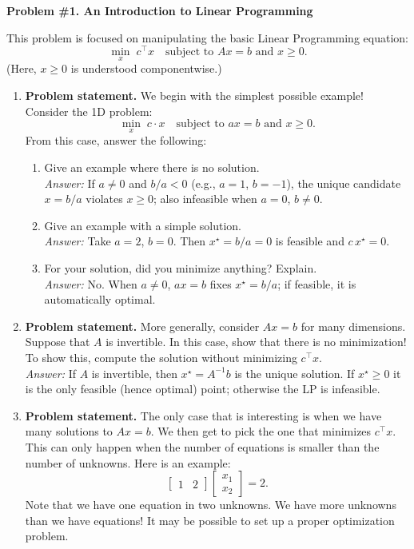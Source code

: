 \documentclass[11pt]{article}
\begin{document}
	
\textbf{Problem \#1. An Introduction to Linear Programming}
	
This problem is focused on manipulating the basic Linear Programming equation:
\begin{equation}
	\min_{x}\; c^{\top}x
	\quad \text{subject to } Ax = b \text{ and } x \ge 0.
	\label{eq:lp}
\end{equation}
(Here, $x \ge 0$ is understood componentwise.)
	
\begin{enumerate}[label=\textbf{1(\alph*)}]
		
\item \textbf{Problem statement.}
We begin with the simplest possible example! Consider the 1D problem:
\begin{equation}
	\min_{x}\; c \cdot x
	\quad \text{subject to } a x = b \text{ and } x \ge 0.
	\label{eq:1d}
\end{equation}
From this case, answer the following:
\begin{enumerate}[label=\roman*)]
	\item Give an example where there is no solution.\\
	\emph{Answer:} If $a\neq 0$ and $b/a<0$ (e.g., $a=1$, $b=-1$), the unique candidate $x=b/a$ violates $x\ge 0$; also infeasible when $a=0$, $b\neq 0$.
	\item Give an example with a simple solution.\\
	\emph{Answer:} Take $a=2$, $b=0$. Then $x^\star=b/a=0$ is feasible and $c\,x^\star=0$.
	\item For your solution, did you minimize anything? Explain.\\
	\emph{Answer:} No. When $a\neq 0$, $ax=b$ fixes $x^\star=b/a$; if feasible, it is automatically optimal.
\end{enumerate}
		
\item \textbf{Problem statement.}
More generally, consider $Ax = b$ for many dimensions. Suppose that $A$ is invertible. In this case, show that there is no minimization! To show this, compute the solution without minimizing $c^{\top}x$.\\
\emph{Answer:} If $A$ is invertible, then $x^\star=A^{-1}b$ is the unique solution. If $x^\star\ge 0$ it is the only feasible (hence optimal) point; otherwise the LP is infeasible.
		
\item \textbf{Problem statement.}
The only case that is interesting is when we have many solutions to $Ax = b$. We then get to pick the one that minimizes $c^{\top}x$. This can only happen when the number of equations is smaller than the number of unknowns. Here is an example:
	\[
	\begin{bmatrix} 1 & 2 \end{bmatrix}
	\begin{bmatrix} x_1 \\ x_2 \end{bmatrix} = 2.
	\]
Note that we have one equation in two unknowns. We have more unknowns than we have equations! It may be possible to set up a proper optimization problem.
		

\end{enumerate}
\end{document}
